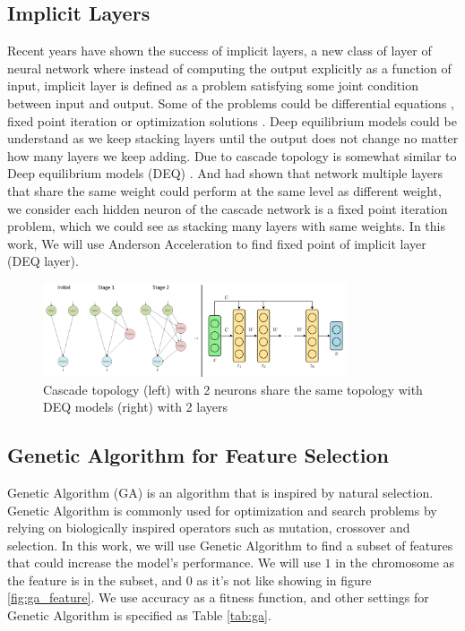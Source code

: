 \documentclass[runningheads]{llncs}
\begin{document}
\subsection{Implicit Layers}
Recent years have shown the success of implicit layers, a new class of layer of neural network where instead of computing the output explicitly as a function of input, implicit layer is defined as a problem satisfying some joint condition between input and output. Some of the problems could be differential equations \cite{neural_ode}, fixed point iteration \cite{deq_paper} or optimization solutions \cite{ddn}. Deep equilibrium models could be understand as we keep stacking layers until the output does not change no matter how many layers we keep adding. Due to cascade topology is somewhat similar to Deep equilibrium models (DEQ) \cite{deq_paper}. And \cite{bai2019trellis} had shown that network multiple layers that share the same weight could perform at the same level as different weight, we consider each hidden neuron of the cascade network is a fixed point iteration problem, which we could see as stacking many layers with same weights. In this work, We will use Anderson Acceleration\cite{anderson} to find fixed point of implicit layer (DEQ layer).
\begin{figure}
    \centering
    \includegraphics[width=0.8\textwidth]{cascade_topology.PNG}
    \caption{Cascade topology (left) with 2 neurons share the same topology with DEQ models (right) with 2 layers}
    \label{fig:my_label}
\end{figure}
\subsection{Genetic Algorithm for Feature Selection}
Genetic Algorithm (GA) is an algorithm that is inspired by natural selection. Genetic Algorithm is commonly used for optimization and search problems by relying on biologically inspired operators such as mutation, crossover and selection. In this work, we will use Genetic Algorithm to find a subset of features that could increase the model's performance. We will use $1$ in the chromosome as the feature is in the subset, and $0$ as it's not like showing in figure \ref{fig:ga_feature}. We use accuracy as a fitness function, and other settings for Genetic Algorithm is specified as Table \ref{tab:ga}.
\end{document}
